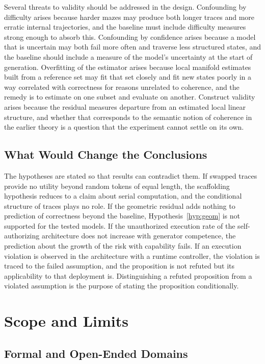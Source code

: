 Several threats to validity should be addressed in the design. Confounding by difficulty arises because harder mazes may produce both longer traces and more erratic internal trajectories, and the baseline must include difficulty measures strong enough to absorb this. Confounding by confidence arises because a model that is uncertain may both fail more often and traverse less structured states, and the baseline should include a measure of the model's uncertainty at the start of generation. Overfitting of the estimator arises because local manifold estimates built from a reference set may fit that set closely and fit new states poorly in a way correlated with correctness for reasons unrelated to coherence, and the remedy is to estimate on one subset and evaluate on another. Construct validity arises because the residual measures departure from an estimated local linear structure, and whether that corresponds to the semantic notion of coherence in the earlier theory is a question that the experiment cannot settle on its own.

\section{What Would Change the Conclusions}

The hypotheses are stated so that results can contradict them. If swapped traces provide no utility beyond random tokens of equal length, the scaffolding hypothesis reduces to a claim about serial computation, and the conditional structure of traces plays no role. If the geometric residual adds nothing to prediction of correctness beyond the baseline, Hypothesis~\ref{hyp:geom} is not supported for the tested models. If the unauthorized execution rate of the self-authorizing architecture does not increase with generator competence, the prediction about the growth of the risk with capability fails. If an execution violation is observed in the architecture with a runtime controller, the violation is traced to the failed assumption, and the proposition is not refuted but its applicability to that deployment is. Distinguishing a refuted proposition from a violated assumption is the purpose of stating the proposition conditionally.

\chapter{Scope and Limits}
\label{ch:limits}

\section{Formal and Open-Ended Domains}

